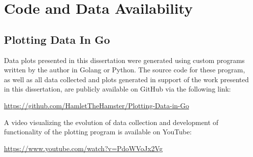 \chapter{Code and Data Availability}
\label{appendix:CodeandDataAvailability}
\acresetall


%


\section{Plotting Data In Go}

Data plots presented in this dissertation were generated using custom programs written by the author in Golang or Python. The source code for these program, as well as all data collected and plots generated in support of the work presented in this dissertation, are publicly available on GitHub via the following link:

\hfill

\begin{center}
  \url{https://github.com/HamletTheHamster/Plotting-Data-in-Go}
\end{center}

\hfill

A video visualizing the evolution of data collection and development of functionality of the plotting program is available on YouTube:

\hfill

\begin{center}
  \url{https://www.youtube.com/watch?v=PdoWVoJx2Vg}
\end{center}

%

\cleardoublepage
